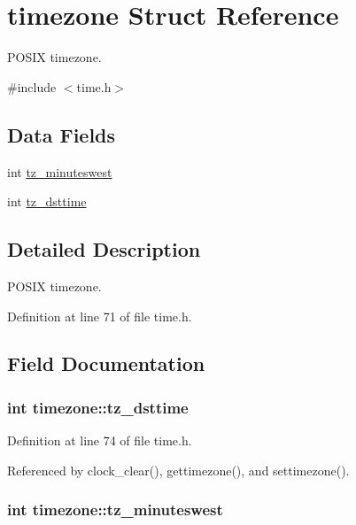 \hypertarget{structtimezone}{\section{timezone Struct Reference}
\label{structtimezone}
}


P\-O\-S\-I\-X timezone.  




{\ttfamily \#include $<$time.\-h$>$}

\subsection*{Data Fields}
\begin{DoxyCompactItemize}
\item 
int \hyperlink{structtimezone_a3042f7eff6e1b980728def76b1fa0eb7}{tz\-\_\-minuteswest}
\item 
int \hyperlink{structtimezone_a85259977aeb63b17e6ce94f19afdfd99}{tz\-\_\-dsttime}
\end{DoxyCompactItemize}


\subsection{Detailed Description}
P\-O\-S\-I\-X timezone. 

Definition at line 71 of file time.\-h.



\subsection{Field Documentation}
\hypertarget{structtimezone_a85259977aeb63b17e6ce94f19afdfd99}{
\subsubsection[{tz\-\_\-dsttime}]{\setlength{\rightskip}{0pt plus 5cm}int timezone\-::tz\-\_\-dsttime}}\label{structtimezone_a85259977aeb63b17e6ce94f19afdfd99}


Definition at line 74 of file time.\-h.



Referenced by clock\-\_\-clear(), gettimezone(), and settimezone().

\hypertarget{structtimezone_a3042f7eff6e1b980728def76b1fa0eb7}{
\subsubsection[{tz\-\_\-minuteswest}]{\setlength{\rightskip}{0pt plus 5cm}int timezone\-::tz\-\_\-minuteswest}}\label{structtimezone_a3042f7eff6e1b980728def76b1fa0eb7}


